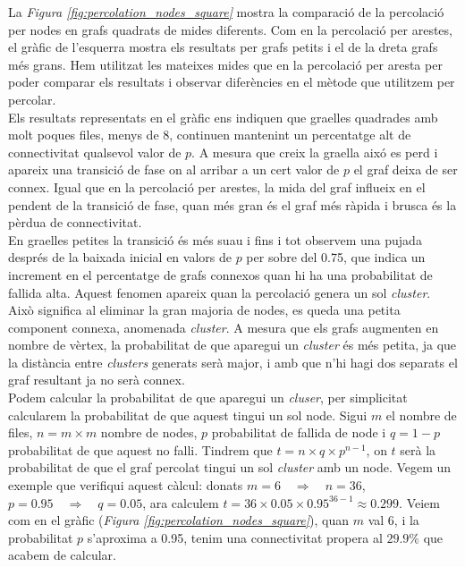 \documentclass[a4paper]{article}
\begin{document}
	La \textit{Figura \ref{fig:percolation_nodes_square}} mostra la comparació de la percolació per nodes en grafs quadrats de mides diferents. Com en la percolació per arestes, el gràfic de l'esquerra mostra els resultats per grafs petits i el de la dreta grafs més grans. Hem utilitzat les mateixes mides que en la percolació per aresta per poder comparar els resultats i observar diferències en el mètode que utilitzem per percolar. \\
	
	Els resultats representats en el gràfic ens indiquen que graelles quadrades amb molt poques files, menys de 8, continuen mantenint un percentatge alt de connectivitat qualsevol valor de $p$. A mesura que creix la graella aixó es perd i apareix una transició de fase on al arribar a un cert valor de $p$ el graf deixa de ser connex. Igual que en la percolació per arestes, la mida del graf influeix en el pendent de la transició de fase, quan més gran és el graf més ràpida i brusca és la pèrdua de connectivitat. \\
	
	En graelles petites la transició és més suau i fins i tot observem una pujada després de la baixada inicial en valors de $p$ per sobre del 0.75, que indica un increment en el percentatge de grafs connexos quan hi ha una probabilitat de fallida alta. Aquest fenomen apareix quan la percolació genera un sol \textit{cluster}. Això significa al eliminar la gran majoria de nodes, es queda una petita component connexa, anomenada \textit{cluster}. A mesura que els grafs augmenten en nombre de vèrtex, la probabilitat de que aparegui un \textit{cluster} és més petita, ja que la distància entre \textit{clusters} generats serà major, i amb que n'hi hagi dos separats el graf resultant ja no serà connex. \\
	
	Podem calcular la probabilitat de que aparegui un \textit{cluser}, per simplicitat calcularem la probabilitat de que aquest tingui un sol node. Sigui $m$ el nombre de files, $n = m \times m$ nombre de nodes, $p$ probabilitat de fallida de node i $q = 1 - p$ probabilitat de que aquest no falli. Tindrem que $t = n \times q \times p^{n-1}$, on $t$ serà la probabilitat de que el graf percolat tingui un sol \textit{cluster} amb un node. Vegem un exemple que verifiqui aquest càlcul: donats $m = 6 \quad \Rightarrow \quad n = 36$, $p = 0.95 \quad \Rightarrow \quad q = 0.05$, ara calculem $t = 36 \times 0.05 \times 0.95^{36-1} \approx 0.299$. Veiem com en el gràfic (\textit{Figura \ref{fig:percolation_nodes_square}}), quan $m$ val 6, i la probabilitat $p$ s'aproxima a 0.95, tenim una connectivitat propera al $29.9\%$ que acabem de calcular. \\
	
\end{document}
